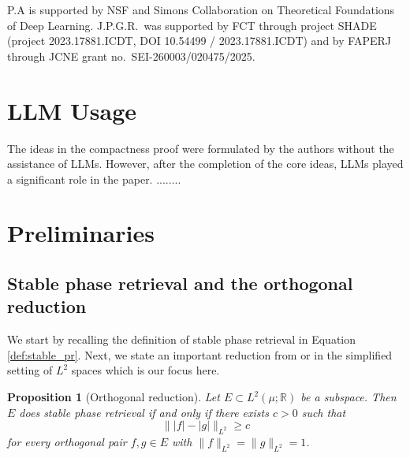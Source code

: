 \documentclass[11pt]{amsart}
\numberwithin{equation}{section}
\newtheorem{proposition}[theorem]{Proposition}
\theoremstyle{definition}
\newtheorem{definition}[theorem]{Definition}
\theoremstyle{remark}
\newcommand{\abs}[1]{\lvert #1 \rvert}
\newcommand{\norm}[1]{\lVert #1 \rVert}
\begin{document}
P.A is supported by NSF and  Simons Collaboration on Theoretical Foundations of Deep Learning. J.P.G.R.~was supported by FCT through project SHADE (project 2023.17881.ICDT, DOI  10.54499 / 2023.17881.ICDT) and by FAPERJ through JCNE grant no.~SEI-260003/020475/2025. 

\section*{LLM Usage} 
The ideas in the compactness proof were formulated by the authors without the assistance of LLMs. However, after the completion of the core ideas, LLMs played a significant role in the paper. ........

\section{Preliminaries}\label{sec:preliminaries}

\subsection{Stable phase retrieval and the orthogonal reduction} We start by recalling the definition of stable phase retrieval in  Equation \ref{def:stable_pr}. Next, we state an important reduction from \cite[Theorem~3.9]{FOTP} or  \cite[Theorem~2.1]{localphase} in the simplified setting of $L^2$ spaces which is our focus here. 



\begin{proposition}[Orthogonal reduction]\label{prop:orth-reduction}
Let $E\subset L^2(\mu;\mathbb{R})$ be a subspace. Then $E$
does stable phase retrieval if and only if there exists $c>0$ such that
\[
\norm{\abs{f}-\abs{g}}_{L^2}\ge c
\]
for every orthogonal pair $f,g\in E$ with $\norm{f}_{L^2}=\norm{g}_{L^2}=1$. 
\end{proposition}
\end{document}
